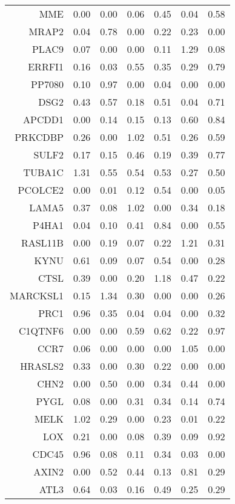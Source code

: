 \begin{longtable}{rrrrrrr}
  MME & 0.00 & 0.00 & 0.06 & 0.45 & 0.04 & 0.58 \\ 
  MRAP2 & 0.04 & 0.78 & 0.00 & 0.22 & 0.23 & 0.00 \\ 
  PLAC9 & 0.07 & 0.00 & 0.00 & 0.11 & 1.29 & 0.08 \\ 
  ERRFI1 & 0.16 & 0.03 & 0.55 & 0.35 & 0.29 & 0.79 \\ 
  PP7080 & 0.10 & 0.97 & 0.00 & 0.04 & 0.00 & 0.00 \\ 
  DSG2 & 0.43 & 0.57 & 0.18 & 0.51 & 0.04 & 0.71 \\ 
  APCDD1 & 0.00 & 0.14 & 0.15 & 0.13 & 0.60 & 0.84 \\ 
  PRKCDBP & 0.26 & 0.00 & 1.02 & 0.51 & 0.26 & 0.59 \\ 
  SULF2 & 0.17 & 0.15 & 0.46 & 0.19 & 0.39 & 0.77 \\ 
  TUBA1C & 1.31 & 0.55 & 0.54 & 0.53 & 0.27 & 0.50 \\ 
  PCOLCE2 & 0.00 & 0.01 & 0.12 & 0.54 & 0.00 & 0.05 \\ 
  LAMA5 & 0.37 & 0.08 & 1.02 & 0.00 & 0.34 & 0.18 \\ 
  P4HA1 & 0.04 & 0.10 & 0.41 & 0.84 & 0.00 & 0.55 \\ 
  RASL11B & 0.00 & 0.19 & 0.07 & 0.22 & 1.21 & 0.31 \\ 
  KYNU & 0.61 & 0.09 & 0.07 & 0.54 & 0.00 & 0.28 \\ 
  CTSL & 0.39 & 0.00 & 0.20 & 1.18 & 0.47 & 0.22 \\ 
  MARCKSL1 & 0.15 & 1.34 & 0.30 & 0.00 & 0.00 & 0.26 \\ 
  PRC1 & 0.96 & 0.35 & 0.04 & 0.04 & 0.00 & 0.32 \\ 
  C1QTNF6 & 0.00 & 0.00 & 0.59 & 0.62 & 0.22 & 0.97 \\ 
  CCR7 & 0.06 & 0.00 & 0.00 & 0.00 & 1.05 & 0.00 \\ 
  HRASLS2 & 0.33 & 0.00 & 0.30 & 0.22 & 0.00 & 0.00 \\ 
  CHN2 & 0.00 & 0.50 & 0.00 & 0.34 & 0.44 & 0.00 \\ 
  PYGL & 0.08 & 0.00 & 0.31 & 0.34 & 0.14 & 0.74 \\ 
  MELK & 1.02 & 0.29 & 0.00 & 0.23 & 0.01 & 0.22 \\ 
  LOX & 0.21 & 0.00 & 0.08 & 0.39 & 0.09 & 0.92 \\ 
  CDC45 & 0.96 & 0.08 & 0.11 & 0.34 & 0.03 & 0.00 \\ 
  AXIN2 & 0.00 & 0.52 & 0.44 & 0.13 & 0.81 & 0.29 \\ 
  ATL3 & 0.64 & 0.03 & 0.16 & 0.49 & 0.25 & 0.29 \\ 

\end{longtable}
